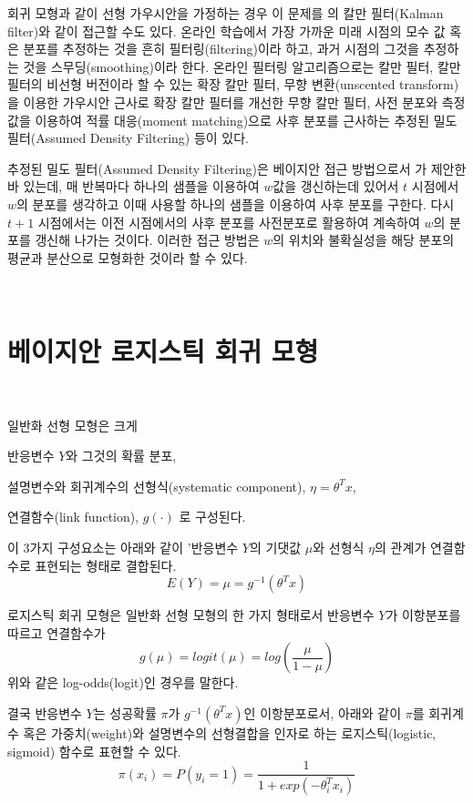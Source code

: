 \documentclass[oneside,b5paper,11pt]{book}
\theoremstyle{plain}
\theoremstyle{definition}
\theoremstyle{remark}
\theoremstyle{definition}
\numberwithin{equation}{chapter}
\begin{document}
 회귀 모형과 같이 선형 가우시안을 가정하는 경우 이 문제를 \citet{Kalman1960}의 칼만 필터(Kalman filter)와 같이 접근할 수도 있다. 온라인 학습에서 가장 가까운 미래 시점의 모수 값 혹은 분포를 추정하는 것을 흔히 필터링(filtering)이라 하고, 과거 시점의 그것을 추정하는 것을 스무딩(smoothing)이라 한다. 온라인 필터링 알고리즘으로는 칼만 필터\citep{Kalman1960}, 칼만 필터의 비선형 버전이라 할 수 있는 확장 칼만 필터\citep{Smith1962}, 무향 변환(unscented transform)을 이용한 가우시안 근사로 확장 칼만 필터를 개선한 무향 칼만 필터\citep{Julier1997}, 사전 분포와 측정값을 이용하여 적률 대응(moment matching)으로 사후 분포를 근사하는 추정된 밀도 필터(Assumed Density Filtering)\citep{Opper1996} 등이 있다.

 추정된 밀도 필터(Assumed Density Filtering)은 베이지안 접근 방법으로서 \citet{Opper1996}가 제안한바 있는데, 매 반복마다 하나의 샘플을 이용하여 $w$값을 갱신하는데 있어서 $t$ 시점에서 $w$의 분포를 생각하고 이때 사용할 하나의 샘플을 이용하여 사후 분포를 구한다. 다시 $t+1$ 시점에서는 이전 시점에서의 사후 분포를 사전분포로 활용하여 계속하여 $w$의 분포를 갱신해 나가는 것이다. 이러한 접근 방법은 $w$의 위치와 불확실성을 해당 분포의 평균과 분산으로 모형화한 것이라 할 수 있다.


{}\
\section{베이지안 로지스틱 회귀 모형}
{}\

일반화 선형 모형은 크게
\begin{inparaenum}[i)]
\item 반응변수 $Y$와 그것의 확률 분포,\quad
\item 설명변수와 회귀계수의 선형식(systematic component), $\eta = \theta^T x$, \quad
\item 연결함수(link function), $g(\cdot)$ 로 구성된다.
\end{inparaenum} 이 3가지 구성요소는 아래와 같이 '반응변수 $Y$의 기댓값 $\mu$와 선형식 $\eta$의 관계가 연결함수로 표현되는 형태로 결합된다.\citep{Agresti1996}
$$E(Y) = \mu = g^{-1}(\theta^T x)$$

 로지스틱 회귀 모형은 일반화 선형 모형의 한 가지 형태로서 반응변수 $Y$가 이항분포를 따르고 연결함수가
$$
g(\mu) = logit(\mu) =log \left(\frac{\mu}{1-\mu}\right)
$$
위와 같은 log-odds(logit)인 경우를 말한다.

결국 반응변수 $Y$는 성공확률 $\pi$가 $g^{-1}(\theta^T x)$인 이항분포로서, 아래와 같이 $\pi$를 회귀계수 혹은 가중치(weight)와 설명변수의 선형결합을 인자로 하는 로지스틱(logistic, sigmoid) 함수로 표현할 수 있다.
$$
\pi(x_i) = P(y_i=1) = \frac{1}{1+exp(-\theta_i^T x_i)}
$$
\end{document}
